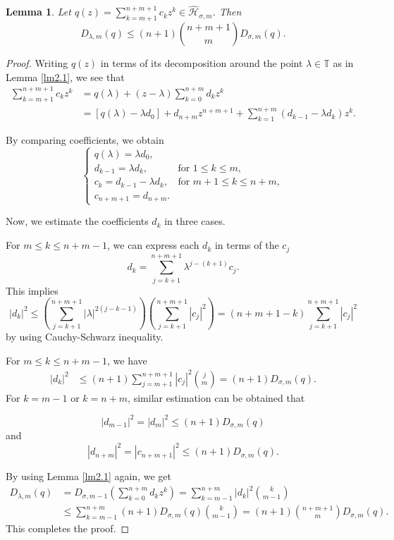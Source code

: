 \documentclass[12pt,reqno]{amsart}
\newtheorem{lemma}[theorem]{Lemma}
\begin{document}
 \begin{lemma}\label{lm4.7}
Let \( q(z) = \sum\limits_{k = m+1}^{n + m +1} c_k z^k \in \widehat{\mathcal{H}}_{\sigma, m} \). Then
\[
D_{\lambda ,m}(q) \le (n + 1) \binom{n+m+1}{m} D_{\sigma ,m}(q).
\]
\end{lemma}
\begin{proof}
Writing \( q(z) \) in terms of its decomposition around the point \( \lambda \in \mathbb{T} \) as in Lemma \ref{lm2.1}, we see that
\begin{align*}
\sum_{k = m + 1}^{n + m + 1} c_k z^k
&= q(\lambda) + (z - \lambda) \sum_{k = 0}^{n + m} d_k z^k \\
&= \left[ {q(\lambda ) - \lambda {d_0}} \right] + d_{n+m} z^{n+m+1} + \sum_{k = 1}^{n+m} (d_{k-1} - \lambda d_k) z^k.
\end{align*}

By comparing coefficients, we obtain
\[
\left\{
\begin{array}{ll}
q(\lambda ) = \lambda {d_0},\\
{d_{k - 1}} = \lambda {d_k}, & \text{for } 1 \le k \le m, \\
c_k = d_{k-1} - \lambda d_k, & \text{for } m+1 \le k \le n + m, \\
c_{n+m+1} = d_{n+m}. &
\end{array}
\right.
\]

Now, we estimate the coefficients $d_{k}$ in three cases.

For \( m \le k \le n + m - 1 \), we can express each \( d_k \) in terms of the \( c_j \)
\[
d_k = \sum_{j = k + 1}^{n + m + 1} \lambda^{j - (k + 1)} c_j.
\]
This implies
\[
|d_k|^2 \le \left( \sum_{j = k + 1}^{n + m + 1} |\lambda|^{2(j - k - 1)} \right)
\left( \sum_{j = k + 1}^{n + m + 1} |c_j|^2 \right)
= (n + m +1 - k) \sum_{j = k + 1}^{n + m + 1} |c_j|^2
\]
by using Cauchy-Schwarz inequality.

For \( m \le k \le n + m - 1 \), we have
\begin{align*}
|d_k|^2
&\le (n + 1) \sum_{j = m + 1}^{n + m + 1} |c_j|^2 \binom{j}{m}
= (n + 1) D_{\sigma,m}(q).
\end{align*}
For $ k=m-1 $ or  $ k=n+m $, similar estimation can be obtained that


\[
|d_{m-1}|^2 = |d_{m}|^2 \le (n + 1) D_{\sigma, m}(q)
\]
and
\[
|d_{n+m}|^2 = |c_{n+m+1}|^2 \le (n + 1) D_{\sigma, m}(q).
\]

By using Lemma \ref{lm2.1} again, we get
\begin{align*}
D_{\lambda, m}(q)
&= D_{\sigma, m - 1} \left( \sum_{k = 0}^{n + m} d_k z^k \right)
= \sum_{k = m - 1}^{n + m} |d_k|^2 \binom{k}{m - 1} \\
&\le \sum_{k = m - 1}^{n + m} (n + 1) D_{\sigma, m}(q) \binom{k}{m - 1}
= (n + 1) \binom{n + m + 1}{m} D_{\sigma, m}(q).
\end{align*}
This completes the proof.
\end{proof}
\end{document}
